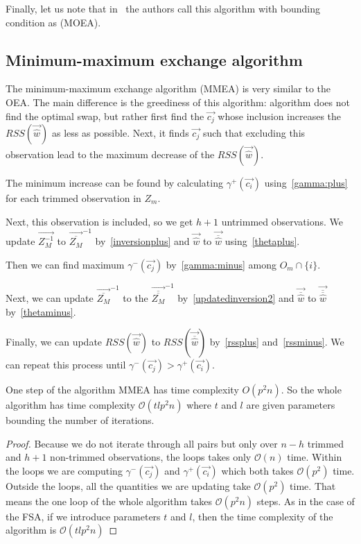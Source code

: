 Finally, let us note that in~\cite{agullo2001new} the authors call this algorithm with bounding condition as  (MOEA).




\subsection{Minimum-maximum exchange algorithm} \label{mmeasection}
The minimum-maximum exchange algorithm (MMEA) is very similar to the OEA. The main difference is the greediness of this algorithm: algorithm does not find the optimal swap, but rather first find the $\vec{c_j}$  whose inclusion increases the $RSS(\vec{\hat{w}})$ as less as possible.
Next, it finds $\vec{c_j}$ such that excluding this observation lead to the maximum decrease of the $RSS(\vec{\hat{w}})$.

The minimum increase can be found by calculating $\gamma^{+}(\vec{c_i}) $ using~\eqref{gamma:plus} for each trimmed observation in  $Z_m$.

Next, this observation is included, so we get $h+1$ untrimmed observations. We update 
$\vec{Z_M^{-1}}$ to  $\vec{\overline{Z_M}}^{-1}$ by~\eqref{inversionplus} and $\vec{\hat{w}}$ to $\vec{\overline{\hat{w}}}$ using~\eqref{thetaplus}.

Then we can find maximum  $\gamma^{-}(\vec{c_j})$ by~\eqref{gamma:minus} among $O_m \cap \{ i \}$.

Next, we can update $\vec{\overline{Z_M}}^{-1}$ to the   $\vec{\overline{\overline{Z_M}}}^{-1}$ by~\eqref{updatedinversion2} and 
$\vec{\overline{\hat{w}}}$ to $\vec{\overline{\overline{\hat{w}}}}$ by~\eqref{thetaminus}.

Finally, we can update $RSS(\vec{\hat{w}})$ to $RSS(\vec{\overline{\hat{w}}})$ by~\eqref{rssplus} and~\eqref{rssminus}. We can repeat this process until $\gamma^{-}(\vec{c_j}) > \gamma^{+}(\vec{c_i})$.

\begin{observation} \label{timecomplexitymmea}
    One step of the algorithm MMEA has time complexity $O(p^2n)$. So the whole algorithm has time complexity $\mathcal{O}(tlp^2n)$ where $t$ and $l$ are given parameters bounding the number of iterations.
\end{observation}

\begin{proof}
    Because we do not iterate through all pairs but only over $n-h$ trimmed and $h+1$  non-trimmed observations, the loops takes only $\mathcal{O}(n)$ time. Within the loops we are computing $\gamma^{-}(\vec{c_j}) $ and $\gamma^{+}(\vec{c_i})$ which both takes $\mathcal{O}(p^2)$ time. Outside the loops, all the quantities we are updating take $\mathcal{O}(p^2)$ time.
That means the one loop of the whole algorithm takes $\mathcal{O}(p^2n)$ steps.
As in the case of the FSA, if we introduce parameters $t$ and $l$, then the time complexity of the algorithm is $\mathcal{O}(tlp^2n)$
\end{proof}






